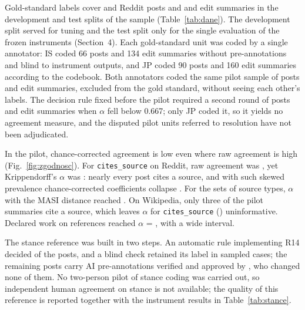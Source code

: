 \documentclass[10pt,a4paper]{article}
\newcommand{\kod}[1]{\texttt{#1}}
\begin{document}
Gold-standard labels cover \resRedditCodedDev{} and \resRedditCodedTest{} Reddit posts and
\resWikipediaCodedDev{} and \resWikipediaCodedTest{} edit summaries in the development and
test splits of the sample (Table~\ref{tab:dane}).
The development split served for tuning and the test split only for the single
evaluation of the frozen instruments (Section~4).
Each gold-standard unit was coded by a single annotator: IS coded 66 posts and 134 edit
summaries without pre-annotations and blind to instrument outputs, and JP coded 90 posts
and 160 edit summaries according to the
codebook. Both annotators coded the same pilot sample of
\resRedditPilot{} posts and \resWikipediaPilot{} edit summaries, excluded from the gold
standard, without seeing each other's labels. The decision rule fixed before the pilot
required a second round of \resRedditPilotTwo{} posts and \resWikipediaPilotTwo{} edit
summaries when $\alpha$ fell below 0.667; only JP coded it, so it yields no agreement
measure, and the \resPilotDisputes{} disputed pilot units referred to resolution have
not been adjudicated.

In the pilot, chance-corrected agreement is low even where raw agreement is high
(Fig.~\ref{fig:zgodnosc}). For \kod{cites\_source} on Reddit, raw agreement was
\resPilotRedditCitesAgreement{}, yet Krippendorff's $\alpha$ \cite{krippendorff2004} was
\resPilotRedditCitesAlpha: nearly every post cites a source, and with such skewed
prevalence chance-corrected coefficients collapse \cite{feinstein1990}. For the sets of
source types, $\alpha$ with the MASI distance \cite{passonneau2006} reached
\resPilotRedditMasiAlpha. On Wikipedia, only three of the \resWikipediaPilot{} pilot
summaries cite a source, which leaves $\alpha$ for \kod{cites\_source}
(\resPilotWikipediaCitesAlpha) uninformative.
Declared work on references reached $\alpha$ = \resPilotWikipediaEditAlpha, with a wide
interval.


The stance reference was built in two steps. An automatic rule implementing R14 decided
\resPlanCStanceAutoShare{} of the posts, and a blind check retained its label in
\resPlanCStanceRulePrecision{} sampled cases; the remaining \resPlanCAiChecked{} posts carry
AI pre-annotations verified and approved by \resPlanCCheckedBy, who changed none of them.
No two-person pilot of stance coding was carried out, so independent human agreement on
stance is not available; the quality of this reference is reported together with the
instrument results in Table~\ref{tab:stance}.
\end{document}
